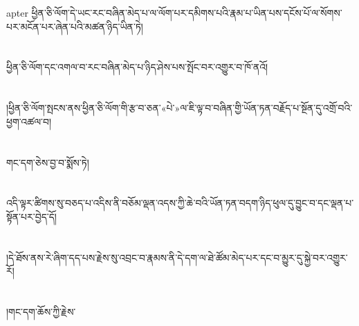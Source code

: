 apter{ }ཕྱིན་ཅི་ལོག་དེ་ཡང་རང་བཞིན་མེད་པ་ལ་ལོག་པར་དམིགས་པའི་རྣམ་པ་ཡིན་པས་དངོས་པོ་ལ་སོགས་པར་མངོན་པར་ཞེན་པའི་མཚན་ཉིད་ཡིན་ཏེ།\chapter{ }ཕྱིན་ཅི་ལོག་དང་འགལ་བ་རང་བཞིན་མེད་པ་ཉིད་ཤེས་པས་སྤོང་བར་འགྱུར་བ་ཁོ་ནའོ།\chapter{ }།ཕྱིན་ཅི་ལོག་སྤངས་ནས་ཕྱིན་ཅི་ལོག་གི་རྩ་བ་ཅན་«པེ་»ལ་ཇི་ལྟ་བ་བཞིན་གྱི་ཡོན་ཏན་བརྗོད་པ་སྔོན་དུ་འགྲོ་བའི་ཕྱག་འཚལ་བ།\chapter{ }གང་དག་ཅེས་བྱ་བ་སྨོས་ཏེ།\chapter{ }འདི་ལྟར་ཚིགས་སུ་བཅད་པ་འདིས་ནི་བཅོམ་ལྡན་འདས་ཀྱི་ཆེ་བའི་ཡོན་ཏན་བདག་ཉིད་ཕུལ་དུ་བྱུང་བ་དང་ལྡན་པ་སྟོན་པར་བྱེད་དོ།\chapter{ }།དེ་ཐོས་ནས་རེ་ཞིག་དད་པས་རྗེས་སུ་འབྲང་བ་རྣམས་ནི་དེ་དག་ལ་ཐེ་ཚོམ་མེད་པར་དང་བ་མྱུར་དུ་སྐྱེ་བར་འགྱུར་རོ།\chapter{ }།གང་དག་ཆོས་ཀྱི་རྗེས་